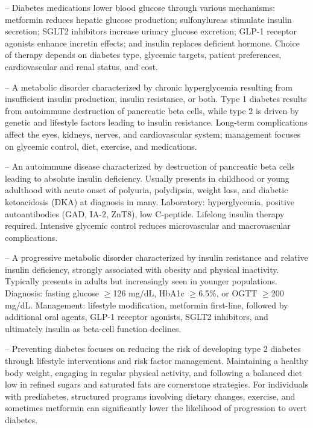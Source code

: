 -- Diabetes medications lower blood glucose through various mechanisms: metformin reduces hepatic glucose production; sulfonylureas stimulate insulin secretion; SGLT2 inhibitors increase urinary glucose excretion; GLP-1 receptor agonists enhance incretin effects; and insulin replaces deficient hormone. Choice of therapy depends on diabetes type, glycemic targets, patient preferences, cardiovascular and renal status, and cost.

-- A metabolic disorder characterized by chronic hyperglycemia resulting from insufficient insulin production, insulin resistance, or both. Type 1 diabetes results from autoimmune destruction of pancreatic beta cells, while type 2 is driven by genetic and lifestyle factors leading to insulin resistance. Long-term complications affect the eyes, kidneys, nerves, and cardiovascular system; management focuses on glycemic control, diet, exercise, and medications.

-- An autoimmune disease characterized by destruction of pancreatic beta cells leading to absolute insulin deficiency. Usually presents in childhood or young adulthood with acute onset of polyuria, polydipsia, weight loss, and diabetic ketoacidosis (DKA) at diagnosis in many. Laboratory: hyperglycemia, positive autoantibodies (GAD, IA-2, ZnT8), low C-peptide. Lifelong insulin therapy required. Intensive glycemic control reduces microvascular and macrovascular complications.

-- A progressive metabolic disorder characterized by insulin resistance and relative insulin deficiency, strongly associated with obesity and physical inactivity. Typically presents in adults but increasingly seen in younger populations. Diagnosis: fasting glucose \(\ge\)126 mg/dL, HbA1c \(\ge\)6.5\%, or OGTT \(\ge\)200 mg/dL. Management: lifestyle modification, metformin first-line, followed by additional oral agents, GLP-1 receptor agonists, SGLT2 inhibitors, and ultimately insulin as beta-cell function declines.

-- Preventing diabetes focuses on reducing the risk of developing type 2 diabetes through lifestyle interventions and risk factor management. Maintaining a healthy body weight, engaging in regular physical activity, and following a balanced diet low in refined sugars and saturated fats are cornerstone strategies. For individuals with prediabetes, structured programs involving dietary changes, exercise, and sometimes metformin can significantly lower the likelihood of progression to overt diabetes.


